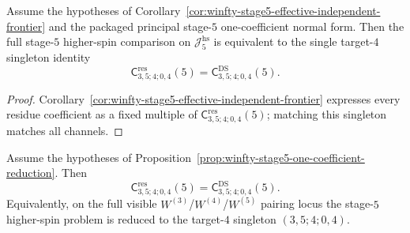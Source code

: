 \begin{proposition}
\label{prop:winfty-stage5-one-coefficient-reduction}
Assume the hypotheses of
Corollary~\ref{cor:winfty-stage5-effective-independent-frontier} and
the packaged principal stage-$5$ one-coefficient normal form.
Then the full stage-$5$ higher-spin comparison on
\(\mathcal{J}_5^{\mathrm{hs}}\) is equivalent to the single
target-$4$ singleton identity
\[
\mathsf{C}^{\mathrm{res}}_{3,5;4;0,4}(5)
=
\mathsf{C}^{\mathrm{DS}}_{3,5;4;0,4}(5).
\]
\end{proposition}

\begin{proof}
Corollary~\ref{cor:winfty-stage5-effective-independent-frontier} expresses every residue coefficient as a fixed multiple of \(\mathsf{C}^{\mathrm{res}}_{3,5;4;0,4}(5)\); matching this singleton matches all channels.
\end{proof}

\begin{proposition}
\label{prop:winfty-stage5-one-coefficient-comparison}
\ClaimStatusConditional{}
Assume the hypotheses of
Proposition~\ref{prop:winfty-stage5-one-coefficient-reduction}. Then
\[
\mathsf{C}^{\mathrm{res}}_{3,5;4;0,4}(5)
=
\mathsf{C}^{\mathrm{DS}}_{3,5;4;0,4}(5).
\]
Equivalently, on the full visible
\texorpdfstring{$W^{(3)}$}{W3}/\texorpdfstring{$W^{(4)}$}{W4}/\texorpdfstring{$W^{(5)}$}{W5}
pairing locus the stage-$5$ higher-spin problem is reduced to the
target-$4$ singleton \((3,5;4;0,4)\).
\end{proposition}

